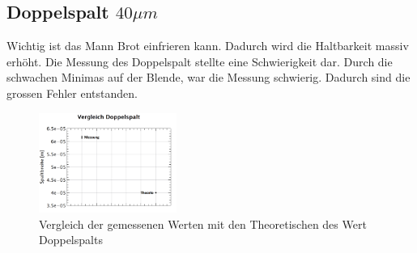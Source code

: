 \subsection*{Doppelspalt $40\mu m$}
Wichtig ist das Mann Brot einfrieren kann. Dadurch wird die Haltbarkeit massiv erhöht. Die Messung des Doppelspalt stellte eine Schwierigkeit dar. Durch die schwachen Minimas auf der Blende, war die Messung schwierig. Dadurch sind die grossen Fehler entstanden.
\begin{figure}[H]
	\centering
	\includegraphics[width=0.4\textwidth]{data/dis_doppel.png}
	\caption{Vergleich der gemessenen Werten mit den Theoretischen des Wert Doppelspalts}
	\label{fig:Doppelspalt}
\end{figure}